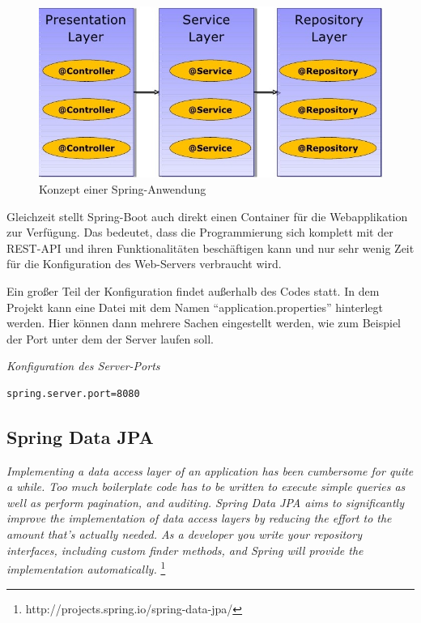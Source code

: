 \begin{figure}[htp]     %
\centering
\includegraphics[width=1\textwidth]{bilder/SpringLayers} 
\caption[\url{http://image.slidesharecdn.com/springsourceusi2009v3-0-090702135517-phpapp01/95/developing-modular-java-applications-13-728.jpg?cb=1246543977}]{Konzept einer Spring-Anwendung}
\end{figure} 

Gleichzeit stellt Spring-Boot auch direkt einen Container für die Webapplikation zur Verfügung. Das bedeutet, dass die Programmierung sich komplett mit der REST-API und ihren Funktionalitäten beschäftigen kann und nur sehr wenig Zeit für die Konfiguration des Web-Servers verbraucht wird.

Ein großer Teil der Konfiguration findet außerhalb des Codes statt. In dem Projekt kann eine Datei mit dem Namen ``application.properties'' hinterlegt werden. Hier können dann mehrere Sachen eingestellt werden, wie zum Beispiel der Port unter dem der Server laufen soll.

\begin{minipage}{\textwidth}
\emph{Konfiguration des Server-Ports}
\begin{lstlisting}
spring.server.port=8080
\end{lstlisting} 
\end{minipage}

\subsection{Spring Data JPA}

\emph{\glqq   
Implementing a data access layer of an application has been cumbersome for quite a while. Too much boilerplate code has to be written to execute simple queries as well as perform pagination, and auditing. Spring Data JPA aims to significantly improve the implementation of data access layers by reducing the effort to the amount that’s actually needed. As a developer you write your repository interfaces, including custom finder methods, and Spring will provide the implementation automatically.
\grqq} \footnote{http://projects.spring.io/spring-data-jpa/} \\

